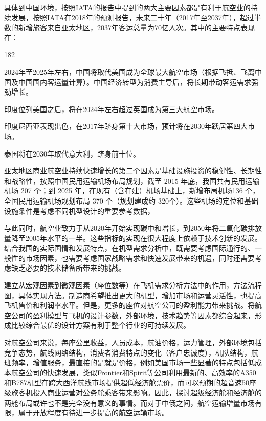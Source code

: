 \documentclass[12pt,a4paper]{report}
\begin{document}
具体到中国环境，按照IATA的报告中提到的两大主要因素都是有利于航空业的持续发展，按照IATA在2018年的预测报告\cite{iata}，未来二十年（2017年至2037年），超过半数的新增旅客来自亚太地区，2037年客运总量为70亿人次。其中的主要特点表现在：
\begin{dingautolist}{182}
\item 2024年至2025年左右，中国将取代美国成为全球最大航空市场（根据飞抵、飞离中国及中国国内客运量计算）。中国经济转型为消费主导后，将长期带动客运需求强劲增长。
\item 印度位列美国之后，将在2024年左右超过英国成为第三大航空市场。
\item 印度尼西亚表现出色，在2017年跻身第十大市场，预计将在2030年跃居第四大市场。
\item 泰国将在2030年取代意大利，跻身前十位。
\end{dingautolist}

亚太地区商业航空业持续快速增长的第二个因素是基础设施投资的稳健性、长期性和战略性，按照中国民用运输机场布局规划\cite{china-airports}，截至 2015 年底，我国共有民用运输机场 207 个；到 2025 年，在现有（含在建）机场基础上，新增布局机场136 个，全国民用运输机场规划布局 370 个（规划建成约 320个）。这些机场的定位和基础设施条件是考虑不同机型设计的重要参考数据，


与此同时，航空业致力于从2020年开始实现碳中和增长，到2050年将二氧化碳排放量降至2005年水平的一半。这些指标的实现在很大程度上依赖于技术创新的发展。结合我国的实际国情和发展特点，在机型需求分析中，既需要考虑国际通行的、一般性的市场因素，也需要考虑国家战略需求和快速发展带来的机遇，同时还需要考虑缺乏必要的技术储备所带来的挑战。

建立从宏观因素到微观因素（座位数等）在飞机需求分析方法中的作用，方法流程图，具体实现方法。制造商希望推出更大的机型，增加市场和运营灵活性，也提高飞机售价和利润率水平。但是，更多的座位对航空公司的盈利能力带来挑战。将航空公司的盈利模型与飞机的设计参数，外部环境，技术趋势等因素都综合起来，形成比较综合最优的设计方案有利于整个行业的可持续发展。

对航空公司来说，每座公里收益，人员成本，航油价格，运力管理，外部环境包括竞争态势，航线网络结构，消费者消费特点的变化（客户忠诚度），机队结构，航班频率，增值服务，最直接的是就是价格，例如美国市场一些显著的特点包括低成本航空公司的快速发展，类似Frontier和Spirit等公司利用最新的、高效率的A350和B787机型在跨大西洋航线市场提供超低经济舱票价，而可以预期的超音速50座级旅客机投入商业运营对公务舱乘客带来影响。因此，探讨超级经济舱和经济舱的两舱布局或许也不是完全没有意义的事情。而对于中俄之间，航空运输增量市场有限，属于开放程度有待进一步提高的航空运输市场。
\end{document}
